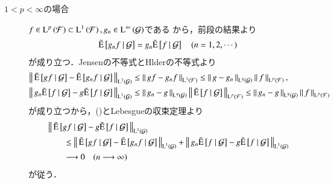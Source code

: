 \begin{prf}
\begin{description}
\begin{description}
					\item[$1 < p < \infty$の場合]
						$f \in \Lp{p}{\mathcal{F}} \subset \Lp{1}{\mathcal{F}},g_n \in \Lp{\infty}{\mathcal{G}}$である
						から，前段の結果より
						\begin{align}
							\tcexp{g_nf}{\mathcal{G}} = g_n\tcexp{f}{\mathcal{G}}
							\quad (n = 1,2,\cdots)
							\label{eq:conditional_exp_L1_3}
						\end{align}
						が成り立つ．Jensenの不等式とHlderの不等式より
						\begin{align}
							\Norm{\tcexp{gf}{\mathcal{G}} - \tcexp{g_nf}{\mathcal{G}}}{\Lp{1}{\mathcal{G}}}
							&\leq \Norm{gf - g_nf}{\Lp{1}{\mathcal{F}}}
							\leq \Norm{g - g_n}{\Lp{q}{\mathcal{G}}} \Norm{f}{\Lp{p}{\mathcal{F}}}, \\
							\Norm{g_n \tcexp{f}{\mathcal{G}} -g \tcexp{f}{\mathcal{G}}}{\Lp{1}{\mathcal{G}}}
							&\leq \Norm{g_n - g}{\Lp{q}{\mathcal{G}}} \Norm{\tcexp{f}{\mathcal{G}}}{\Lp{p}{\mathcal{F}}}
							\leq \Norm{g_n - g}{\Lp{q}{\mathcal{G}}} \Norm{f}{\Lp{p}{\mathcal{F}}}
						\end{align}
						が成り立つから，()とLebesgueの収束定理より
						\begin{align}
							&\Norm{\tcexp{gf}{\mathcal{G}} - g\tcexp{f}{\mathcal{G}}}{\Lp{1}{\mathcal{G}}} \\
							&\qquad \leq \Norm{\tcexp{gf}{\mathcal{G}} - \tcexp{g_nf}{\mathcal{G}}}{\Lp{1}{\mathcal{G}}}
								+ \Norm{g_n \tcexp{f}{\mathcal{G}} - g \tcexp{f}{\mathcal{G}}}{\Lp{1}{\mathcal{G}}} \\
							&\qquad \longrightarrow 0 \quad (n \longrightarrow \infty)
						\end{align}
						が従う．
				\end{description}
				

\end{description}
\end{prf}
